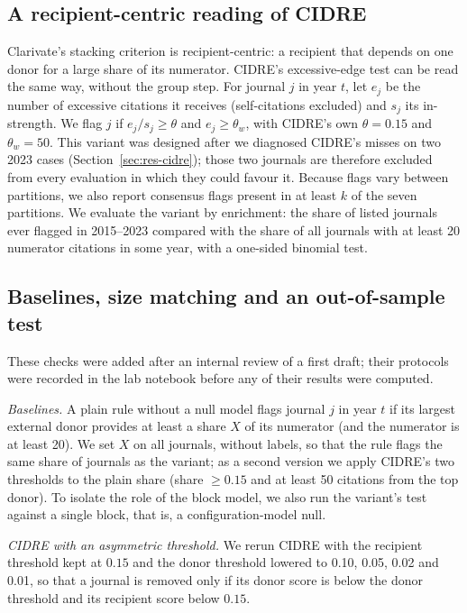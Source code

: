 \subsection{A recipient-centric reading of CIDRE}
Clarivate's stacking criterion is recipient-centric: a recipient that depends on one donor for a large share of its
numerator. CIDRE's excessive-edge test can be read the same way, without the group step. For journal $j$ in year
$t$, let $e_j$ be the number of excessive citations it receives (self-citations excluded) and $s_j$ its in-strength.
We flag $j$ if $e_j/s_j \ge \theta$ and $e_j \ge \theta_w$, with CIDRE's own $\theta=0.15$ and $\theta_w=50$. This
variant was designed after we diagnosed CIDRE's misses on two 2023 cases (Section~\ref{sec:res-cidre}); those two
journals are therefore excluded from every evaluation in which they could favour it. Because flags vary between
partitions, we also report consensus flags present in at least $k$ of the seven partitions. We evaluate the variant by
enrichment: the share of listed journals ever flagged in 2015--2023 compared with the share of all journals with at
least 20 numerator citations in some year, with a one-sided binomial test.

\subsection{Baselines, size matching and an out-of-sample test}\label{sec:m-robust}
These checks were added after an internal review of a first draft; their protocols were recorded in the lab notebook
before any of their results were computed.

\emph{Baselines.} A plain rule without a null model flags journal $j$ in year $t$ if its largest external donor
provides at least a share $X$ of its numerator (and the numerator is at least 20). We set $X$ on all journals, without
labels, so that the rule flags the same share of journals as the variant; as a second version we apply CIDRE's two
thresholds to the plain share (share $\ge0.15$ and at least 50 citations from the top donor). To isolate the role of
the block model, we also run the variant's test against a single block, that is, a configuration-model null.

\emph{CIDRE with an asymmetric threshold.} We rerun CIDRE with the recipient threshold kept at $0.15$ and the donor
threshold lowered to 0.10, 0.05, 0.02 and 0.01, so that a journal is removed only if its donor score is below the
donor threshold and its recipient score below $0.15$.

